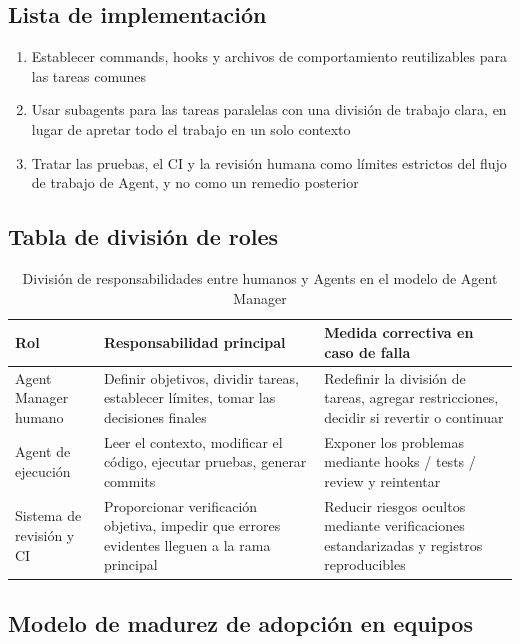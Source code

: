 \documentclass[a4paper]{article}
\begin{document}
\subsection{Lista de implementación}

\begin{enumerate}
    \item Establecer commands, hooks y archivos de comportamiento reutilizables para las tareas comunes
    \item Usar subagents para las tareas paralelas con una división de trabajo clara, en lugar de apretar todo el trabajo en un solo contexto
    \item Tratar las pruebas, el CI y la revisión humana como límites estrictos del flujo de trabajo de Agent, y no como un remedio posterior
\end{enumerate}

\subsection{Tabla de división de roles}

\begin{table}[H]
\centering
\begin{tabular}{p{} p{} p{}}
\toprule
Rol & Responsabilidad principal & Medida correctiva en caso de falla \\
\midrule
Agent Manager humano & Definir objetivos, dividir tareas, establecer límites, tomar las decisiones finales & Redefinir la división de tareas, agregar restricciones, decidir si revertir o continuar \\
Agent de ejecución & Leer el contexto, modificar el código, ejecutar pruebas, generar commits & Exponer los problemas mediante hooks / tests / review y reintentar \\
Sistema de revisión y CI & Proporcionar verificación objetiva, impedir que errores evidentes lleguen a la rama principal & Reducir riesgos ocultos mediante verificaciones estandarizadas y registros reproducibles \\
\bottomrule
\end{tabular}
\caption{División de responsabilidades entre humanos y Agents en el modelo de Agent Manager}
\end{table}

\subsection{Modelo de madurez de adopción en equipos}
\end{document}
